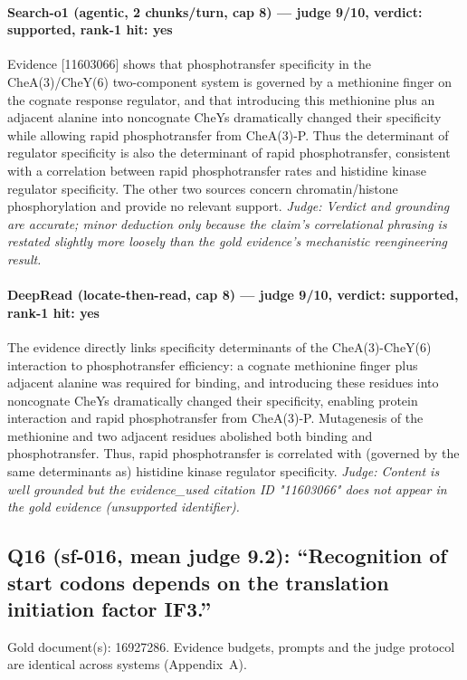 \documentclass[sigconf, review, anonymous]{acmart}
\begin{document}
\paragraph{Search-o1 (agentic, 2 chunks/turn, cap 8) --- judge 9/10, verdict: supported, rank-1 hit: yes}
\noindent Evidence [11603066] shows that phosphotransfer specificity in the CheA(3)/CheY(6) two-component system is governed by a methionine finger on the cognate response regulator, and that introducing this methionine plus an adjacent alanine into noncognate CheYs dramatically changed their specificity while allowing rapid phosphotransfer from CheA(3)-P. Thus the determinant of regulator specificity is also the determinant of rapid phosphotransfer, consistent with a correlation between rapid phosphotransfer rates and histidine kinase regulator specificity. The other two sources concern chromatin/histone phosphorylation and provide no relevant support.
\noindent\small\textit{Judge: Verdict and grounding are accurate; minor deduction only because the claim's correlational phrasing is restated slightly more loosely than the gold evidence's mechanistic reengineering result.}
\paragraph{DeepRead (locate-then-read, cap 8) --- judge 9/10, verdict: supported, rank-1 hit: yes}
\noindent The evidence directly links specificity determinants of the CheA(3)-CheY(6) interaction to phosphotransfer efficiency: a cognate methionine finger plus adjacent alanine was required for binding, and introducing these residues into noncognate CheYs dramatically changed their specificity, enabling protein interaction and rapid phosphotransfer from CheA(3)-P. Mutagenesis of the methionine and two adjacent residues abolished both binding and phosphotransfer. Thus, rapid phosphotransfer is correlated with (governed by the same determinants as) histidine kinase regulator specificity.
\noindent\small\textit{Judge: Content is well grounded but the evidence\_used citation ID "11603066" does not appear in the gold evidence (unsupported identifier).}

\subsection{Q16 (sf-016, mean judge 9.2): ``Recognition of start codons depends on the translation initiation factor IF3.''}
\label{app:q16}
\noindent Gold document(s): 16927286. Evidence budgets, prompts and the judge protocol are identical across systems (Appendix~A).
\end{document}
